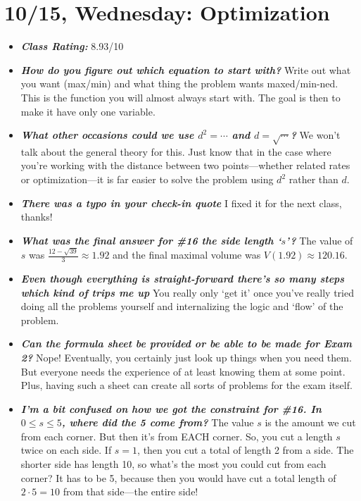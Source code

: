 \documentclass[11pt,letterpaper]{article}
\begin{document}
\newpage
\section*{10/15, Wednesday: Optimization\label{10-13}}

\begin{itemize}
\item {\bfseries\itshape Class Rating:} 8.93/10

\item {\bfseries\itshape How do you figure out which equation to start with?} Write out what you want (max/min) and what thing the problem wants maxed/min-ned. This is the function you will almost always start with. The goal is then to make it have only one variable. 

\item {\bfseries\itshape What other occasions could we use $d^2= \cdots$ and $d= \sqrt{\cdots}$?} We won't talk about the general theory for this. Just know that in the case where you're working with the distance between two points---whether related rates or optimization---it is far easier to solve the problem using $d^2$ rather than $d$.

\item {\bfseries\itshape There was a typo in your check-in quote} I fixed it for the next class, thanks!

\item {\bfseries\itshape What was the final answer for \#16 the side length `$s$'?} The value of $s$ was $\frac{12 - \sqrt{39}}{3} \approx 1.92$ and the final maximal volume was $V(1.92) \approx 120.16$. 

\item {\bfseries\itshape Even though everything is straight-forward there's so many steps which kind of trips me up} You really only `get it' once you've really tried doing all the problems yourself and internalizing the logic and `flow' of the problem.

\item {\bfseries\itshape Can the formula sheet be provided or be able to be made for Exam 2?} Nope! Eventually, you certainly just look up things when you need them. But everyone needs the experience of at least knowing them at some point. Plus, having such a sheet can create all sorts of problems for the exam itself. 

\item {\bfseries\itshape I'm a bit confused on how we got the constraint for \#16. In $0 \leq s \leq 5$, where did the 5 come from?} The value $s$ is the amount we cut from each corner. But then it's from EACH corner. So, you cut a length $s$ twice on each side. If $s= 1$, then you cut a total of length 2 from a side. The shorter side has length 10, so what's the most you could cut from each corner? It has to be 5, because then you would have cut a total length of $2 \cdot 5= 10$ from that side---the entire side!


\end{itemize}
\end{document}

